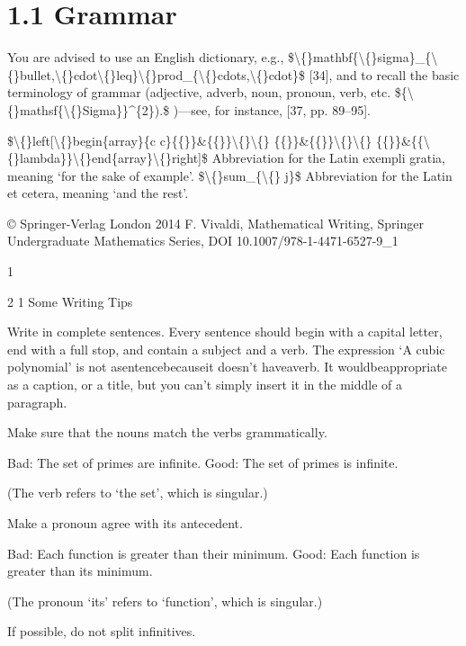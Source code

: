 \documentclass[11pt]{article}
\theoremstyle{plain}
\theoremstyle{definition}
\begin{document}
\section{1.1 Grammar}

You are advised to use an English dictionary, e.g., \$\textbackslash\{\}mathbf\{\textbackslash\{\}sigma\}\_\{\textbackslash\{\}bullet,\textbackslash\{\}cdot\textbackslash\{\}leq\}\textbackslash\{\}prod\_\{\textbackslash\{\}cdots,\textbackslash\{\}cdot\}\$ [34], and to recall the basic terminology of grammar (adjective, adverb, noun, pronoun, verb, etc. \$\{\textbackslash\{\}mathsf\{\textbackslash\{\}Sigma\}\}\textasciicircum{}\{2\}).\$ )---see, for instance, [37, pp. 89--95].

\$\textbackslash\{\}left[\textbackslash\{\}begin\{array\}\{c c\}\{\{\}\}\&\{\{\}\}\textbackslash\{\}\textbackslash\{\} \{\{\}\}\&\{\{\}\}\textbackslash\{\}\textbackslash\{\} \{\{\}\}\&\{\{\textbackslash\{\}lambda\}\}\textbackslash\{\}end\{array\}\textbackslash\{\}right]\$ Abbreviation for the Latin exempli gratia, meaning `for the sake of example'. \$\textbackslash\{\}sum\_\{\textbackslash\{\} j\}\$ Abbreviation for the Latin et cetera, meaning `and the rest'.

© Springer-Verlag London 2014 F. Vivaldi, Mathematical Writing, Springer Undergraduate Mathematics Series, DOI 10.1007/978-1-4471-6527-9\_1

1

2 1 Some Writing Tips

\textbullet{} Write in complete sentences. Every sentence should begin with a capital letter, end with a full stop, and contain a subject and a verb. The expression `A cubic polynomial' is not asentencebecauseit doesn't haveaverb. It wouldbeappropriate as a caption, or a title, but you can't simply insert it in the middle of a paragraph.

\textbullet{} Make sure that the nouns match the verbs grammatically.

Bad: The set of primes are infinite. Good: The set of primes is infinite.

(The verb refers to `the set', which is singular.)

\textbullet{} Make a pronoun agree with its antecedent.

Bad: Each function is greater than their minimum. Good: Each function is greater than its minimum.

(The pronoun `its' refers to `function', which is singular.)

\textbullet{} If possible, do not split infinitives.
\end{document}
